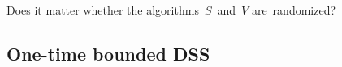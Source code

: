 \begin{exercise}
	Does it matter whether the algorithms~$S$~and~$V$ are~randomized?
\end{exercise}

%

\subsection{One-time bounded DSS}

